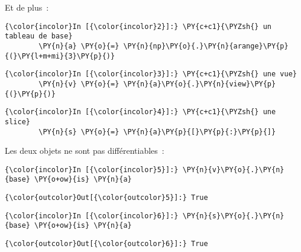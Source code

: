     Et de plus~:

    \begin{Verbatim}[commandchars=\\\{\},frame=single,framerule=0.3mm,rulecolor=\color{cellframecolor}]
{\color{incolor}In [{\color{incolor}2}]:} \PY{c+c1}{\PYZsh{} un tableau de base}
        \PY{n}{a} \PY{o}{=} \PY{n}{np}\PY{o}{.}\PY{n}{arange}\PY{p}{(}\PY{l+m+mi}{3}\PY{p}{)}
\end{Verbatim}


    \begin{Verbatim}[commandchars=\\\{\},frame=single,framerule=0.3mm,rulecolor=\color{cellframecolor}]
{\color{incolor}In [{\color{incolor}3}]:} \PY{c+c1}{\PYZsh{} une vue}
        \PY{n}{v} \PY{o}{=} \PY{n}{a}\PY{o}{.}\PY{n}{view}\PY{p}{(}\PY{p}{)}
\end{Verbatim}


    \begin{Verbatim}[commandchars=\\\{\},frame=single,framerule=0.3mm,rulecolor=\color{cellframecolor}]
{\color{incolor}In [{\color{incolor}4}]:} \PY{c+c1}{\PYZsh{} une slice}
        \PY{n}{s} \PY{o}{=} \PY{n}{a}\PY{p}{[}\PY{p}{:}\PY{p}{]}
\end{Verbatim}


    Les deux objets ne sont pas différentiables~:

    \begin{Verbatim}[commandchars=\\\{\},frame=single,framerule=0.3mm,rulecolor=\color{cellframecolor}]
{\color{incolor}In [{\color{incolor}5}]:} \PY{n}{v}\PY{o}{.}\PY{n}{base} \PY{o+ow}{is} \PY{n}{a}
\end{Verbatim}


\begin{Verbatim}[commandchars=\\\{\},frame=single,framerule=0.3mm,rulecolor=\color{cellframecolor}]
{\color{outcolor}Out[{\color{outcolor}5}]:} True
\end{Verbatim}
            
    \begin{Verbatim}[commandchars=\\\{\},frame=single,framerule=0.3mm,rulecolor=\color{cellframecolor}]
{\color{incolor}In [{\color{incolor}6}]:} \PY{n}{s}\PY{o}{.}\PY{n}{base} \PY{o+ow}{is} \PY{n}{a}
\end{Verbatim}


\begin{Verbatim}[commandchars=\\\{\},frame=single,framerule=0.3mm,rulecolor=\color{cellframecolor}]
{\color{outcolor}Out[{\color{outcolor}6}]:} True
\end{Verbatim}
            
